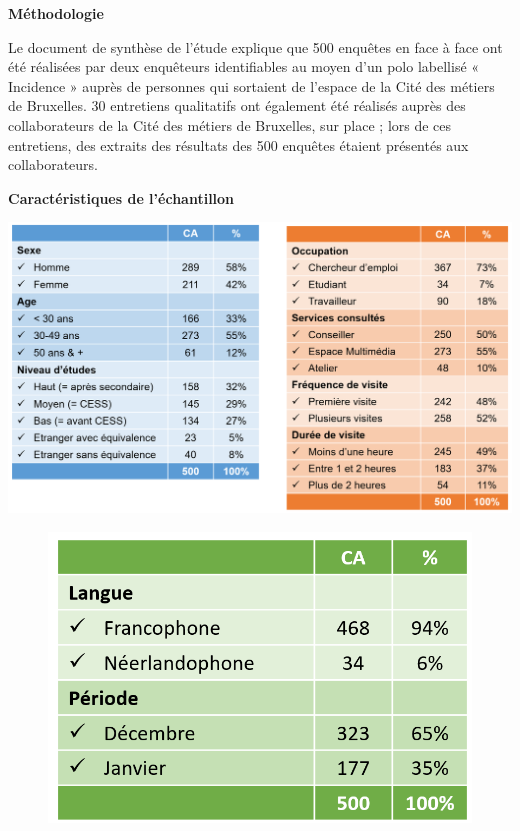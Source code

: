 \documentclass[french,a4paper,12pt]{article}
\begin{document}
{\textbf{Méthodologie}

Le document de synthèse de l’étude explique que 500 enquêtes en face à face ont été réalisées par deux enquêteurs identifiables au moyen d’un polo labellisé « Incidence » auprès de personnes qui sortaient de l’espace de la Cité des métiers de Bruxelles. 30 entretiens qualitatifs ont également été réalisés auprès des collaborateurs de la Cité des métiers de Bruxelles, sur place ; lors de ces entretiens, des extraits des résultats des 500 enquêtes étaient présentés aux collaborateurs.

\textbf{Caractéristiques de l’échantillon}

\includegraphics[scale=0.3]{8-cdm-echantillon1.PNG}
\begin{center}
\begin{figure}
\includegraphics[scale=0.4]{8-cdm-echantillon2.PNG}

\end{figure}
\end{center}}
\end{document}
